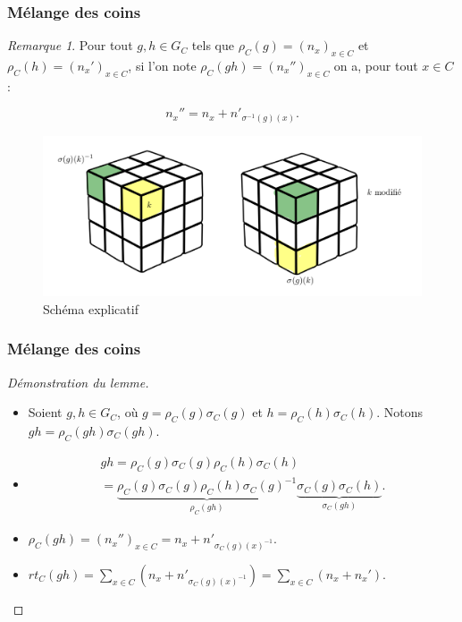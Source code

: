 \documentclass[10pt,notheorems]{beamer}
\theoremstyle{plain}
\theoremstyle{definition}
\theoremstyle{plain}
\theoremstyle{plain}
\theoremstyle{plain}
\theoremstyle{remark}
\newtheorem{remark}{Remarque}
\begin{document}
\begin{frame}
  \frametitle{Mélange des coins}

  \begin{remark}
    Pour tout $g, h \in G_C$ tels que $\rho_C(g) = (n_x) _{x \in C}$ et $\rho_C(h) = (n_x') _{ x \in C}$, si l'on note $\rho_C(gh) = (n_x'') _{x \in C}$ on a, pour tout $x \in C$ :

    $$ n_x'' = n_x + n' _{ \sigma ^{-1}(g)(x)}.$$
  \end{remark}

  \begin{figure}[h!]
    \centering
    \includegraphics[scale=0.2]{figures/composition_orientations_coins.png}
    \caption{Schéma explicatif}
    \label{}
  \end{figure}
\end{frame}

\begin{frame}
  \frametitle{Mélange des coins}

  \begin{proof}[Démonstration du lemme]
    \begin{itemize}
      \item Soient $g, h \in G_C$, où $g = \rho_C(g) \sigma_C(g) $ et $h = \rho_C(h)\sigma_C(h)$. Notons $gh = \rho_C(gh) \sigma_C(gh)$.
      \item \begin{gather*}
        gh = \rho_C(g) \sigma_C(g) \rho_C(h) \sigma_C(h)\\
         = \underbrace{\rho_C(g) \sigma_C(g) \rho_C(h) \sigma_C(g) ^{-1} }_{\rho_C(gh)} \underbrace{\sigma_C(g) \sigma_C(h)}_{\sigma_C(gh)}.
      \end{gather*}
      \item $\rho_C(gh) = (n_x'') _{x \in C} = n_x + n' _{\sigma_C(g)(x) ^{-1} }$.
      \item $rt_C(gh) = \sum_{x \in C}^{} (n_x + n'_{\sigma_C(g)(x) ^{-1} }) = \sum_{x \in C}(n_x+ n_x').$
    \end{itemize}
  \end{proof}
\end{frame}
\end{document}
